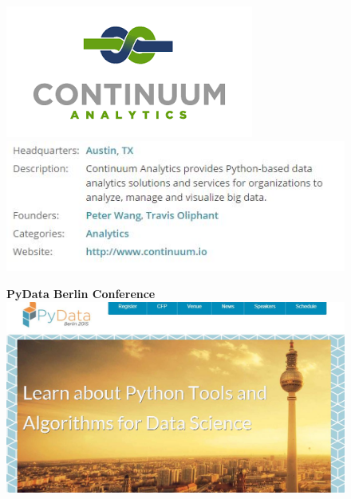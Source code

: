 \documentclass[MASTER.tex]{subfiles}
\begin{document}
	
\begin{frame}
	\begin{figure}
\centering
\includegraphics[width=0.35\linewidth]{continuum}\\
\includegraphics[width=1.1\linewidth]{continuum-about}

\end{figure}

\end{frame}	
	\begin{frame}\begin{figure}
			\textbf{PyData Berlin Conference}
\centering
\includegraphics[width=1.05\linewidth]{pydataberlin}

\end{figure}
	\end{frame}
\end{document}
